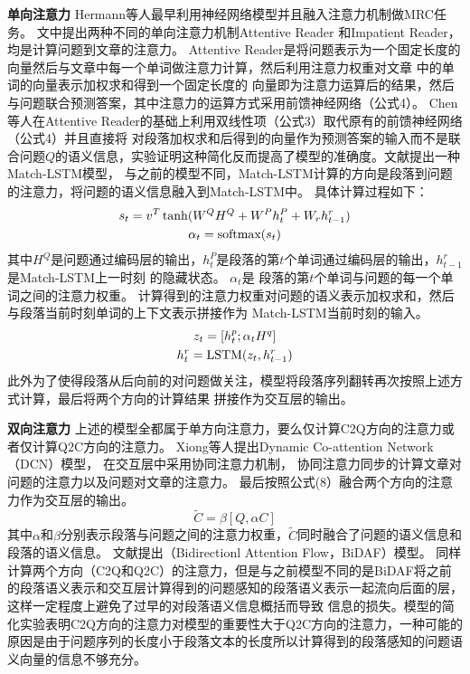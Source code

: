 \documentclass{article}
\begin{document}
\noindent\textbf{单向注意力} \quad Hermann等人\cite{Hermann}最早利用神经网络模型并且融入注意力机制做MRC任务。
文中提出两种不同的单向注意力机制Attentive Reader
和Impatient Reader，均是计算问题到文章的注意力。
Attentive Reader是将问题表示为一个固定长度的向量然后与文章中每一个单词做注意力计算，然后利用注意力权重对文章
中的单词的向量表示加权求和得到一个固定长度的
向量即为注意力运算后的结果，然后与问题联合预测答案，其中注意力的运算方式采用前馈神经网络（公式4）。
Chen等人\cite{AR}在Attentive Reader的基础上利用双线性项（公式3）取代原有的前馈神经网络（公式4）并且直接将
对段落加权求和后得到的向量作为预测答案的输入而不是联合问题$Q$的语义信息，实验证明这种简化反而提高了模型的准确度。文献\cite{MatchLSTM}提出一种Match-LSTM模型，
与之前的模型不同，Match-LSTM计算的方向是段落到问题的注意力，将问题的语义信息融入到Match-LSTM中。
具体计算过程如下：
\begin{gather}
s_t=v^T\tanh(W^QH^Q+W^Ph_t^P+W_rh_{t-1}^r) \notag \\
\alpha_{t}=\text{softmax}(s_t)
\end{gather}
其中$H^Q$是问题通过编码层的输出，$h_t^P$是段落的第$t$个单词通过编码层的输出，$h_{t-1}^r$是Match-LSTM上一时刻
的隐藏状态。
$\alpha_{t}$是
段落的第$t$个单词与问题的每一个单词之间的注意力权重。
计算得到的注意力权重对问题的语义表示加权求和，然后与段落当前时刻单词的上下文表示拼接作为
Match-LSTM当前时刻的输入。
\begin{gather}
z_t=[h_t^p;\alpha_tH^q] \notag \\
h_{t}^r=\text{LSTM}(z_t,h_{t-1}^r)
\end{gather}
此外为了使得段落从后向前的对问题做关注，模型将段落序列翻转再次按照上述方式计算，最后将两个方向的计算结果
拼接作为交互层的输出。
\vspace{1ex}

\noindent \textbf{双向注意力} \quad 上述的模型全都属于单方向注意力，要么仅计算C2Q方向的注意力或者仅计算Q2C方向的注意力。
Xiong等人\cite{DCN}提出Dynamic Co-attention Network（DCN）模型，
在交互层中采用协同注意力机制，
协同注意力同步的计算文章对问题的注意力以及问题对文章的注意力。
最后按照公式(8）融合两个方向的注意力作为交互层的输出。
\begin{equation}
\widetilde{C}=\beta[Q,\alpha C]
\end{equation}
其中$\alpha$和$\beta$分别表示段落与问题之间的注意力权重，$\widetilde{C}$同时融合了问题的语义信息和段落的语义信息。
文献\cite{BiDAF}提出（Bidirectionl Attention Flow，BiDAF）模型。
同样计算两个方向（C2Q和Q2C）的注意力，但是与之前模型不同的是BiDAF将之前的段落语义表示和交互层计算得到的问题感知的段落语义表示一起流向后面的层，这样一定程度上避免了过早的对段落语义信息概括而导致
信息的损失。模型的简化实验表明C2Q方向的注意力对模型的重要性大于Q2C方向的注意力，一种可能的原因是由于问题序列的长度小于段落文本的长度所以计算得到的段落感知的问题语义向量的信息不够充分。
\vspace{1ex}
\end{document}
